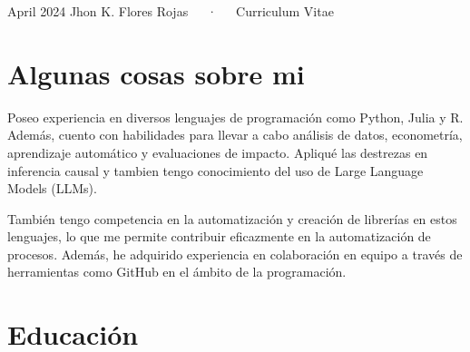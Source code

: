\documentclass[11pt,a4paper,]{awesome-cv}
\begin{document}
\makecvheader

\makecvfooter
  {April 2024}
    {Jhon K. Flores Rojas~~~·~~~Curriculum Vitae}
  {\thepage}





\hypertarget{algunas-cosas-sobre-mi}{%
\section{Algunas cosas sobre mi}\label{algunas-cosas-sobre-mi}}

\begin{cvparagraph}
Poseo experiencia en diversos lenguajes de programación como Python, Julia y R. Además, cuento con habilidades para llevar a cabo análisis de datos, econometría, aprendizaje automático y evaluaciones de  impacto. Apliqué las destrezas en inferencia causal y tambien tengo conocimiento del uso de Large Language Models (LLMs).

También tengo competencia en la automatización y creación de librerías en estos lenguajes, lo que me permite contribuir eficazmente en la automatización de procesos. Además, he adquirido experiencia en colaboración en equipo a través de herramientas como GitHub en el ámbito de la programación.
\end{cvparagraph}

\hypertarget{educaciuxf3n}{%
\section{Educación}\label{educaciuxf3n}}

\begin{cventries}
\end{cventries}
\end{document}
